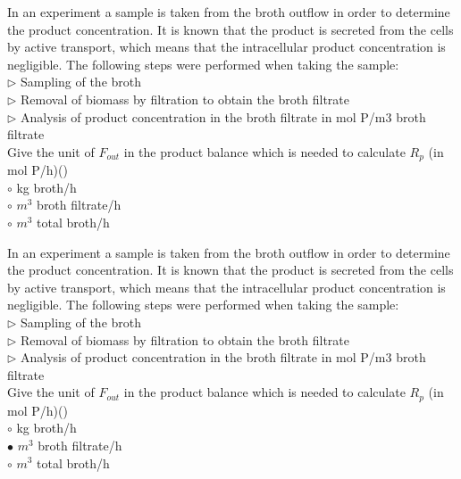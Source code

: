 \documentclass[]{beamer}
\begin{document}
\begin{frame}[shrink] {}
\addtocounter{questions}{1}
\color{blue}
In an experiment a sample is taken from the broth outflow in order to determine the product concentration. It is known that the product is secreted from the cells by active transport, which means that the intracellular product concentration is negligible. The following steps were performed when taking the sample:\\
{\color{red}$\triangleright$} Sampling of the broth\\
{\color{red}$\triangleright$} Removal of biomass by filtration to obtain the broth filtrate\\
{\color{red}$\triangleright$} Analysis of product concentration in the broth filtrate in mol P/m3 broth filtrate\\[0.5em]

Give the unit of $F_{out}$ in the product balance which is needed to calculate $R_p$ (in mol P/h)()\\
\color{black}
\setlength{\parindent}{-0.4cm}
{\color{red}$\circ$}  kg broth/h\\
{\color{red}$\circ$} $m^3$ broth filtrate/h \\
{\color{red}$\circ$} $m^3$ total broth/h \\
\end{frame}
\begin{frame}[shrink] {}
\addtocounter{answers}{1}
\color{blue}
In an experiment a sample is taken from the broth outflow in order to determine the product concentration. It is known that the product is secreted from the cells by active transport, which means that the intracellular product concentration is negligible. The following steps were performed when taking the sample:\\
{\color{red}$\triangleright$} Sampling of the broth\\
{\color{red}$\triangleright$} Removal of biomass by filtration to obtain the broth filtrate\\
{\color{red}$\triangleright$} Analysis of product concentration in the broth filtrate in mol P/m3 broth filtrate\\[0.5em]

Give the unit of $F_{out}$ in the product balance which is needed to calculate $R_p$ (in mol P/h)()\\
\color{black}
\setlength{\parindent}{-0.4cm}
{\color{red}$\circ$}  kg broth/h\\
{\color{red}$\bullet$} $m^3$ broth filtrate/h \\
{\color{red}$\circ$} $m^3$ total broth/h \\
\end{frame}
\end{document}

